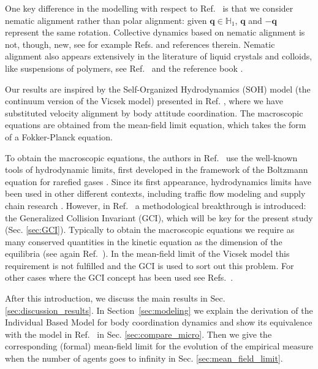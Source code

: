 \documentclass[12pt]{article}
\newcommand{\unitq}{{\mathbb{H}_1}}
\newcommand{\q}{\mathbf{q}}
\begin{document}
 One key difference in the modelling with respect to Ref.~\cite{degond2008continuum} is that we consider nematic alignment rather than polar alignment: given $\q\in \unitq$, $\q$ and $-\q$ represent the same rotation. Collective dynamics based on nematic alignment is not, though, new, see for example Refs. \cite{degond2015continuum,degond2015multi} and references therein. Nematic alignment also appears extensively in the literature of liquid crystals and colloids, like suspensions of polymers, see Ref.~\cite{degond2015continuum} and  the reference book \cite{doi1988theory}.

\medskip

Our results are inspired by the Self-Organized Hydrodynamics (SOH)  model (the continuum version of the Vicsek model) presented in Ref. \cite{degond2008continuum}, where we have substituted velocity alignment by body attitude coordination. The macroscopic equations are obtained from the mean-field limit equation, which takes the form of a Fokker-Planck equation.

To obtain the macroscopic equations, the authors in Ref.~\cite{degond2008continuum} use the well-known tools of hydrodynamic limits, first developed in the framework of the Boltzmann equation for rarefied gases \cite{cercignani2013mathematical,degond2004macroscopic,sone2012kinetic}. Since its first appearance, hydrodynamics limits have been used in other different contexts, including traffic flow modeling \cite{aw2002derivation,helbing2001traffic} and supply chain research \cite{armbruster2006model,degond2007stochastic}. However, in Ref.~\cite{degond2008continuum} a methodological breakthrough is introduced: the Generalized Collision Invariant (GCI), which will be key for the present study (Sec. \ref{sec:GCI}). Typically to obtain the macroscopic equations we require as many conserved quantities in the kinetic equation as the dimension of the equilibria (see again Ref.~\cite{vicsek2012collective}). In the mean-field limit of the Vicsek model this requirement is not fulfilled and the GCI is used to sort out this problem. For other cases where the GCI concept has been used see Refs.~\cite{degond2014hydrodynamics,degond2014macroscopic,bodyattitude,degond2012hydrodynamics,degond2014evolution,degond2015self,frouvelle2012continuum}.







\bigskip

After this introduction, we discuss the main results in Sec. \ref{sec:discussion_results}. In Section~\ref{sec:modeling} we explain the derivation of the Individual Based Model for body coordination dynamics and show its equivalence with the model in Ref.~\cite{bodyattitude} in Sec. \ref{sec:compare_micro}. Then we give the corresponding (formal) mean-field limit for the evolution of the empirical measure when the number of agents goes to infinity in Sec. \ref{sec:mean_field_limit}. 
\end{document}
